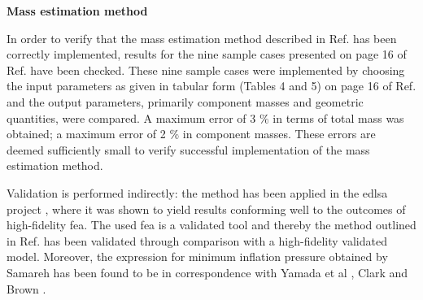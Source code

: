 \textbf{Mass estimation method}

In order to verify that the mass estimation method described in Ref.\cite{Samareh2011} has been correctly implemented, results for the nine sample cases presented on page 16 of Ref.\cite{Samareh2011} have been checked. These nine sample cases were implemented by choosing the input parameters as given in tabular form (Tables 4 and 5) on page 16 of Ref.\cite{Samareh2011} and the output parameters, primarily component masses and geometric quantities, were compared. A maximum error of 3 $\%$ in terms of total mass was obtained; a maximum error of 2 $\%$ in component masses. These errors are deemed sufficiently small to verify successful implementation of the mass estimation method.

Validation is performed indirectly: the method \cite{Samareh2011} has been applied in the \gls{edlsa} project \cite{Cianciolo2010}, where it was shown to yield results conforming well to the outcomes of high-fidelity \gls{fea}. The used \gls{fea} is a validated tool \cite{Cianciolo2010} and thereby the method outlined in Ref.\cite{Samareh2011} has been validated through comparison with a high-fidelity validated model. Moreover, the expression for minimum inflation pressure obtained by Samareh has been found to be in correspondence with Yamada et al \cite{Yamada2009}, Clark \cite{Clark2009} and Brown \cite{Brown2009}.


